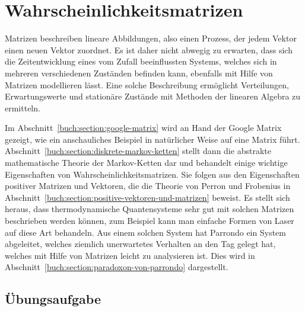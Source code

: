 %
%
%
\chapter{Wahrscheinlichkeitsmatrizen
\label{buch:chapter:wahrscheinlichkeit}}
\rhead{}
Matrizen beschreiben lineare Abbildungen, also einen Prozess, der
jedem Vektor einen neuen Vektor zuordnet.
Es ist daher nicht abwegig zu erwarten, dass sich 
die Zeitentwicklung eines vom Zufall beeinflussten Systems, welches sich
in mehreren verschiedenen Zuständen befinden kann, ebenfalls mit Hilfe
von Matrizen modellieren lässt.
Eine solche Beschreibung ermöglicht Verteilungen,
Erwartungswerte und stationäre Zustände mit Methoden der linearen
Algebra zu ermitteln.

Im Abschnitt~\ref{buch:section:google-matrix} wird an Hand der Google
Matrix gezeigt, wie ein anschauliches Beispiel in natürlicher Weise
auf eine Matrix führt.
Abschnitt~\ref{buch:section:diskrete-markov-ketten} stellt dann die abstrakte
mathematische Theorie der Markov-Ketten dar und behandelt einige wichtige
Eigenschaften von Wahrscheinlichkeitsmatrizen.
Sie folgen aus den Eigenschaften positiver Matrizen und Vektoren, 
die die Theorie von Perron und Frobenius in
Abschnitt~\ref{buch:section:positive-vektoren-und-matrizen}
beweist.
Es stellt sich heraus, dass thermodynamische Quantensysteme sehr gut
mit solchen Matrizen beschrieben werden können, zum Beispiel kann man
einfache Formen von Laser auf diese Art behandeln.
Aus einem solchen System hat Parrondo ein System abgeleitet, welches 
ziemlich unerwartetes Verhalten an den Tag gelegt hat, welches mit
Hilfe von Matrizen leicht zu analysieren ist. 
Dies wird in Abschnitt~\ref{buch:section:paradoxon-von-parrondo}
dargestellt.






\section*{Übungsaufgabe}
\begin{uebungsaufgaben}
\end{uebungsaufgaben}

